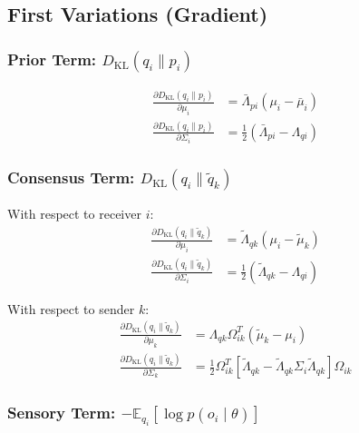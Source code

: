 \documentclass[12pt]{article}
\begin{document}
\subsection{First Variations (Gradient)}

\subsubsection{Prior Term: $D_{\mathrm{KL}}(q_i \| p_i)$}

\begin{align}
\frac{\partial D_{\mathrm{KL}}(q_i \| p_i)}{\partial \mu_i} &= \bar{\Lambda}_{pi}(\mu_i - \bar{\mu}_i) \label{eq:grad_prior_mu} \\[6pt]
\frac{\partial D_{\mathrm{KL}}(q_i \| p_i)}{\partial \Sigma_i} &= \frac{1}{2}(\bar{\Lambda}_{pi} - \Lambda_{qi}) \label{eq:grad_prior_sigma}
\end{align}

\subsubsection{Consensus Term: $D_{\mathrm{KL}}(q_i \| \tilde{q}_k)$}

With respect to receiver $i$:
\begin{align}
\frac{\partial D_{\mathrm{KL}}(q_i \| \tilde{q}_k)}{\partial \mu_i} &= \tilde{\Lambda}_{qk}(\mu_i - \tilde{\mu}_k) \label{eq:grad_consensus_mu_i} \\[6pt]
\frac{\partial D_{\mathrm{KL}}(q_i \| \tilde{q}_k)}{\partial \Sigma_i} &= \frac{1}{2}(\tilde{\Lambda}_{qk} - \Lambda_{qi}) \label{eq:grad_consensus_sigma_i}
\end{align}

With respect to sender $k$:
\begin{align}
\frac{\partial D_{\mathrm{KL}}(q_i \| \tilde{q}_k)}{\partial \mu_k} &= \Lambda_{qk}\Omega_{ik}^T(\tilde{\mu}_k - \mu_i) \label{eq:grad_consensus_mu_k} \\[6pt]
\frac{\partial D_{\mathrm{KL}}(q_i \| \tilde{q}_k)}{\partial \Sigma_k} &= \frac{1}{2}\Omega_{ik}^T\left[\tilde{\Lambda}_{qk} - \tilde{\Lambda}_{qk}\Sigma_i\tilde{\Lambda}_{qk}\right]\Omega_{ik} \label{eq:grad_consensus_sigma_k}
\end{align}

\subsubsection{Sensory Term: $-\mathbb{E}_{q_i}[\log p(o_i \mid \theta)]$}
\end{document}

